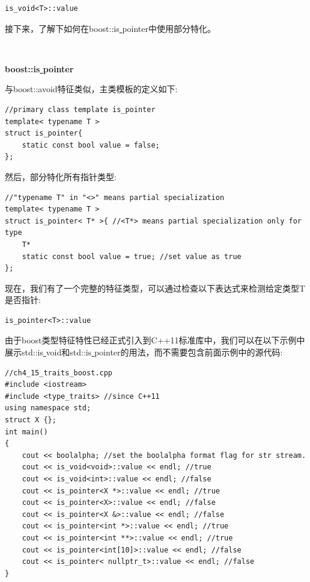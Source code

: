 \begin{lstlisting}[caption={}]
is_void<T>::value
\end{lstlisting}

接下来，了解下如何在boost::is\underline{ }pointer中使用部分特化。 \par

\noindent\textbf{}\ \par
\textbf{boost::is\underline{ }pointer} \ \par
与boost::avoid特征类似，主类模板的定义如下:\par

\begin{lstlisting}[caption={}]
//primary class template is_pointer
template< typename T >
struct is_pointer{
	static const bool value = false;
};
\end{lstlisting}

然后，部分特化所有指针类型: \par

\begin{lstlisting}[caption={}]
//"typename T" in "<>" means partial specialization
template< typename T >
struct is_pointer< T* >{ //<T*> means partial specialization only for type
	T*
	static const bool value = true; //set value as true
};
\end{lstlisting}

现在，我们有了一个完整的特征类型，可以通过检查以下表达式来检测给定类型T是否指针: \par

\begin{lstlisting}[caption={}]
is_pointer<T>::value
\end{lstlisting}

由于boost类型特征特性已经正式引入到C++11标准库中，我们可以在以下示例中展示std::is\underline{ }void和std::is\underline{ }pointer的用法，而不需要包含前面示例中的源代码: \par

\begin{lstlisting}[caption={}]
//ch4_15_traits_boost.cpp
#include <iostream>
#include <type_traits> //since C++11
using namespace std;
struct X {};
int main()
{
	cout << boolalpha; //set the boolalpha format flag for str stream.
	cout << is_void<void>::value << endl; //true
	cout << is_void<int>::value << endl; //false
	cout << is_pointer<X *>::value << endl; //true
	cout << is_pointer<X>::value << endl; //false
	cout << is_pointer<X &>::value << endl; //false
	cout << is_pointer<int *>::value << endl; //true
	cout << is_pointer<int **>::value << endl; //true
	cout << is_pointer<int[10]>::value << endl; //false
	cout << is_pointer< nullptr_t>::value << endl; //false
}
\end{lstlisting}

